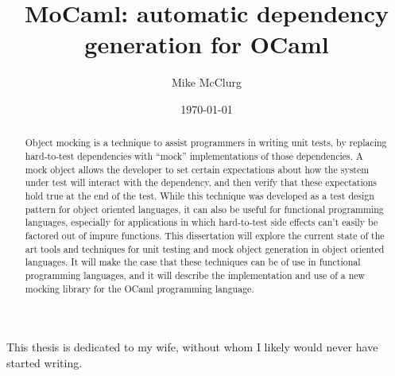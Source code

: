 \documentclass[dissertation]{softeng}
\title{MoCaml: automatic dependency generation for OCaml}
\author{Mike McClurg}
\date{\today}
\begin{document}
\maketitle

\begin{abstract}


  Object mocking is a technique to assist programmers in writing unit
  tests, by replacing hard-to-test dependencies with ``mock''
  implementations of those dependencies. A mock object allows the
  developer to set certain expectations about how the system under
  test will interact with the dependency, and then verify that these
  expectations hold true at the end of the test. While this technique
  was developed as a test design pattern for object oriented
  languages, it can also be useful for functional programming
  languages, especially for applications in which hard-to-test side
  effects can't easily be factored out of impure functions. This
  dissertation will explore the current state of the art tools and
  techniques for unit testing and mock object generation in object
  oriented languages. It will make the case that these techniques can
  be of use in functional programming languages, and it will describe
  the implementation and use of a new mocking library for the OCaml
  programming language.


\end{abstract}

\newpage

\begin{centering}

This thesis is dedicated to my wife, without whom I likely would never
have started writing.

\end{centering}

\newpage

\tableofcontents








\end{document}
